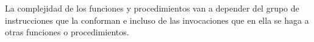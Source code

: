La complejidad de los funciones y procedimientos van a depender  del grupo de instrucciones que la conforman e incluso de las invocaciones que en ella se haga a otras funciones o procedimientos. 